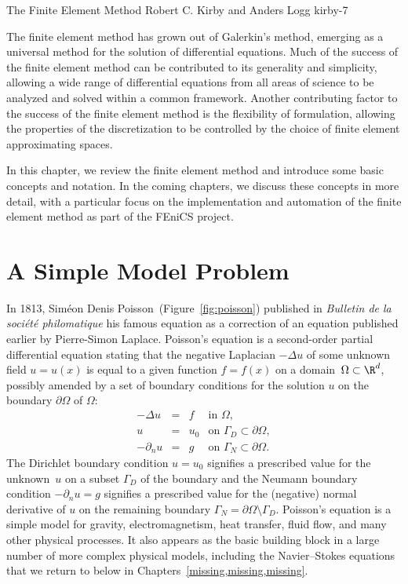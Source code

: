               {The Finite Element Method}
              {Robert C. Kirby and Anders Logg}
              {kirby-7}


The finite element method has grown out of Galerkin's method, emerging
as a universal method for the solution of differential equations. Much
of the success of the finite element method can be contributed to its
generality and simplicity, allowing a wide range of differential
equations from all areas of science to be analyzed and solved within a
common framework. Another contributing factor to the success of the
finite element method is the flexibility of formulation, allowing the
properties of the discretization to be controlled by the choice of
finite element approximating spaces.

In this chapter, we review the finite element method and introduce
some basic concepts and notation. In the coming chapters, we discuss
these concepts in more detail, with a particular focus on the
implementation and automation of the finite element method as part of
the FEniCS project.

\section{A Simple Model Problem}

In 1813, Sim\'eon Denis Poisson~(Figure~\ref{fig:poisson}) published
in \emph{Bulletin de la soci\'et\'e philomatique} his famous equation
as a correction of an equation published earlier by Pierre-Simon
Laplace. Poisson's equation is a second-order partial differential
equation stating that the negative Laplacian $-\Delta u$ of some
unknown field $u = u(x)$ is equal to a given function $f = f(x)$ on a
domain~$\Omega \subset \R^d$, possibly amended by a set of boundary
conditions for the solution $u$ on the boundary $\partial \Omega$ of
$\Omega$:
\begin{equation} \label{eq:poisson}
  \begin{array}{rcll}
    - \Delta u &=& f &\mbox{in } \Omega, \\
    u &=& u_0 &\mbox{on } \Gamma_D \subset \partial \Omega, \\
    - \partial_n u &=& g &\mbox{on } \Gamma_N \subset \partial \Omega.
  \end{array}
\end{equation}
The Dirichlet boundary condition $u = u_0$ signifies a prescribed
value for the unknown~$u$ on a subset $\Gamma_D$ of the boundary and
the Neumann boundary condition $-\partial_n u = g$ signifies a
prescribed value for the (negative) normal derivative of $u$ on the
remaining boundary $\Gamma_N = \partial \Omega \setminus
\Gamma_D$. Poisson's equation is a simple model for gravity,
electromagnetism, heat transfer, fluid flow, and many other physical
processes. It also appears as the basic building block in a large
number of more complex physical models, including the Navier--Stokes
equations that we return to below in
Chapters~\ref{missing,missing,missing}.

